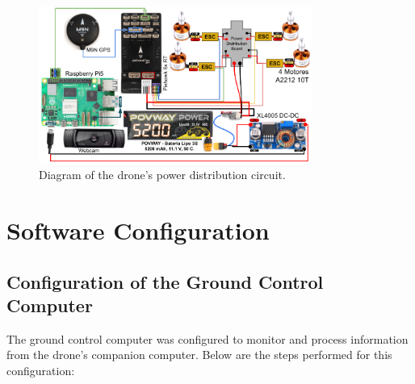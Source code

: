         \begin{center}
            \begin{figure}[H]
                \centering
                \includegraphics[width=0.8\textwidth]{pictures/Circuito RasPi5 (4).png}
                \caption{Diagram of the drone's power distribution circuit.}
            \end{figure}
        \end{center}
    
        

\section{Software Configuration}

\subsection{Configuration of the Ground Control Computer} 
The ground control computer was configured to monitor and process information from the drone's companion computer. Below are the steps performed for this configuration:

